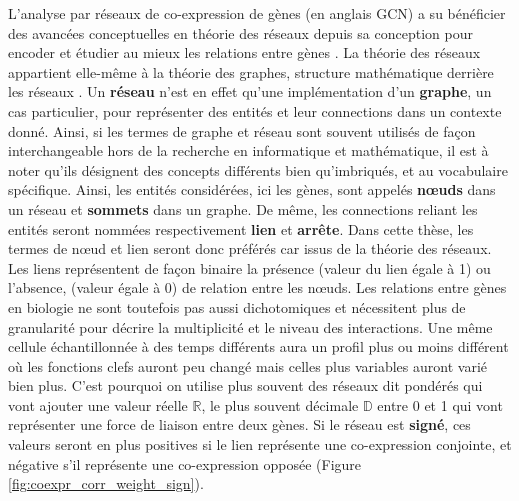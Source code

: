 L'analyse par réseaux de co-expression de gènes (en anglais \acrfull{GCN}) a su bénéficier des avancées conceptuelles en théorie des réseaux depuis sa conception pour encoder et étudier au mieux les relations entre gènes \cite{Barabasi2011Jan}. La théorie des réseaux appartient elle-même à la théorie des graphes, structure mathématique derrière les réseaux \cite{Barnes1983Jun}. Un \textbf{réseau} n'est en effet qu'une implémentation d'un \textbf{graphe}, un cas particulier, pour représenter des entités et leur connections dans un contexte donné. Ainsi, si les termes de graphe et réseau sont souvent utilisés de façon interchangeable hors de la recherche en informatique et mathématique, il est à noter qu'ils désignent des concepts différents bien qu'imbriqués, et au vocabulaire spécifique. Ainsi, les entités considérées, ici les gènes, sont appelés \textbf{nœuds} dans un réseau et \textbf{sommets} dans un graphe. De même, les connections reliant les entités seront nommées respectivement \textbf{lien} et \textbf{arrête}. Dans cette thèse, les termes de nœud et lien seront donc préférés car issus de la théorie des réseaux. Les liens représentent de façon binaire la présence (valeur du lien égale à 1) ou l'absence, (valeur égale à 0) de relation entre les nœuds. Les relations entre gènes en biologie ne sont toutefois pas aussi dichotomiques et nécessitent plus de granularité pour décrire la multiplicité et le niveau des interactions. Une même cellule échantillonnée à des temps différents aura un profil plus ou moins différent où les fonctions clefs auront peu changé mais celles plus variables auront varié bien plus. C'est pourquoi on utilise plus souvent des réseaux dit pondérés qui vont ajouter une valeur réelle $\mathbb{R}$, le plus souvent décimale $\mathbb{D}$ entre 0 et 1 qui vont représenter une force de liaison entre deux gènes. Si le réseau est \textbf{signé}, ces valeurs seront en plus positives si le lien représente une co-expression conjointe, et négative s’il représente une co-expression opposée (Figure \ref{fig:coexpr_corr_weight_sign}).

